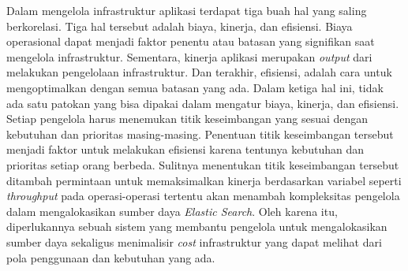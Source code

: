 Dalam mengelola infrastruktur aplikasi terdapat tiga buah hal yang saling berkorelasi. Tiga hal tersebut adalah biaya, kinerja, dan efisiensi. Biaya operasional dapat menjadi faktor penentu atau batasan yang signifikan saat mengelola infrastruktur. Sementara, kinerja aplikasi merupakan \textit{output} dari melakukan pengelolaan infrastruktur. Dan terakhir, efisiensi, adalah cara untuk mengoptimalkan dengan semua batasan yang ada. Dalam ketiga hal ini, tidak ada satu patokan yang bisa dipakai dalam mengatur biaya, kinerja, dan efisiensi. Setiap pengelola harus menemukan titik keseimbangan yang sesuai dengan kebutuhan dan prioritas masing-masing. Penentuan titik keseimbangan tersebut menjadi faktor untuk melakukan efisiensi karena tentunya kebutuhan dan prioritas setiap orang berbeda. Sulitnya menentukan titik keseimbangan tersebut ditambah permintaan untuk memaksimalkan kinerja berdasarkan variabel seperti \textit{throughput} pada operasi-operasi tertentu akan menambah kompleksitas pengelola dalam mengalokasikan sumber daya \textit{Elastic Search}. Oleh karena itu, diperlukannya sebuah sistem yang membantu pengelola untuk mengalokasikan sumber daya sekaligus menimalisir \textit{cost} infrastruktur yang dapat melihat dari pola penggunaan dan kebutuhan yang ada.
